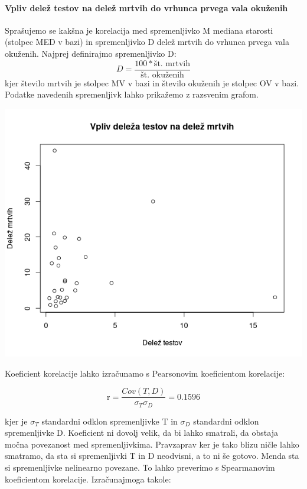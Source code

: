 \documentclass[a4paper,11pt]{article}
\begin{document}
\paragraph{Vpliv delež testov na delež mrtvih do vrhunca prvega vala okuženih}
Sprašujemo se kakšna je korelacija med spremenljivko M mediana starosti (stolpec MED v bazi) in spremenljivko D delež mrtvih do vrhunca prvega vala okuženih. Najprej definirajmo spremenljivko D:
\[D = \frac{100 * \text{št. mrtvih}}{\text{št. okuženih}}\]
kjer število mrtvih je stolpec MV v bazi in število okuženih je stolpec OV v bazi. Podatke navedenih spremenljivk lahko prikažemo z razsvenim grafom.
\\
\begin{center}
\includegraphics[scale=0.6]{vpliv_delez_testov_na_delez_mrtvih}\\
\end{center}
Koeficient korelacije lahko izračunamo s Pearsonovim koeficientom korelacije:

\begin{center}
\[\text{r} = \frac{Cov(T,D)}{\sigma_{T} \sigma_{D}} = 0.1596\]
\end{center} 
kjer je \(\sigma_{T}\) standardni odklon spremenljivke T in \(\sigma_{D}\) standardni odklon spremenljivke D. Koeficient ni dovolj velik, da bi lahko smatrali, da obstaja močna povezanost med spremenljivkima. Pravzaprav ker je tako blizu ničle lahko smatramo, da sta si spremenljivki T in D neodvisni, a to ni še gotovo. Menda sta si spremenljivke nelinearno povezane. To lahko preverimo s Spearmanovim koeficientom korelacije. Izračunajmoga takole: 
\end{document}

